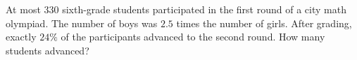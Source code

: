At most $330$ sixth-grade students participated in the first round of a city math olympiad. The number of boys was $2.5$ times the number of girls. After grading, exactly $24\%$ of the participants advanced to the second round. How many students advanced?
